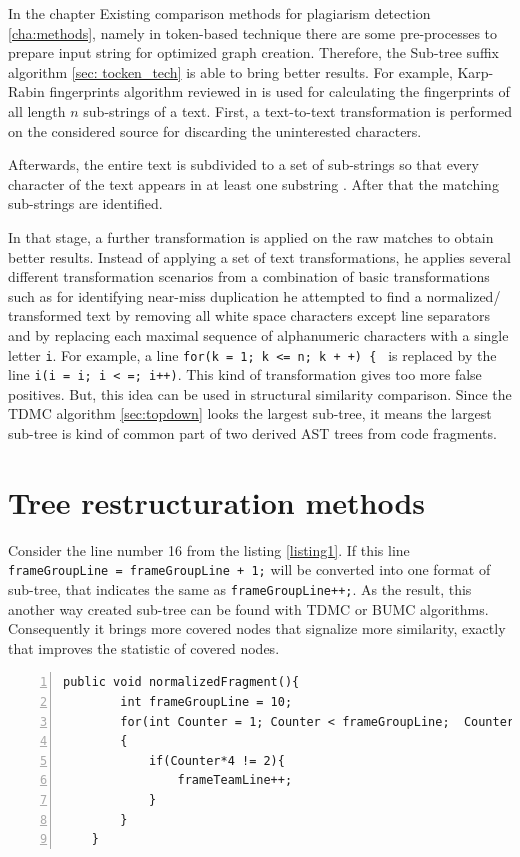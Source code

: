 \documentclass{report}
\begin{document}
In the chapter Existing comparison methods for plagiarism detection \ref{cha:methods}, namely in token-based technique there are some pre-processes to prepare input string for optimized graph creation. Therefore, the Sub-tree suffix algorithm \ref{sec: tocken_tech} is able to bring better results.
For example, Karp-Rabin fingerprints algorithm reviewed in \cite{software_clone_detection} is used for calculating the fingerprints of all
length $n$ sub-strings of a text. First, a text-to-text transformation is performed on the considered source for discarding the uninterested characters.

Afterwards, the entire text
is subdivided to a set of sub-strings so that every character of the text appears in at least
one substring \cite{software_clone_detection}. After that the matching sub-strings are identified. 

In that stage, a further transformation is applied on the raw matches to obtain better results. Instead of applying
a set of text transformations, he applies several different transformation scenarios
from a combination of basic transformations such as for identifying near-miss duplication he
attempted to find a normalized/ transformed text by removing all white space characters
except line separators and by replacing each maximal sequence of alphanumeric characters
with a single letter \texttt{i}. For example, a line \texttt{for(k = 1; k <= n; k + +) \{ } is replaced by
the line \texttt{i(i = i; i < =; i++)}. This kind of transformation gives too more false positives. But, this idea can be used in structural similarity comparison. Since the TDMC algorithm \ref{sec:topdown} looks the largest sub-tree, it means the largest sub-tree is kind of common part of two derived AST trees from code fragments. \\

\section{Tree restructuration methods}
Consider the line number 16 from the listing \ref{listing1}. If this line \texttt{frameGroupLine = frameGroupLine + 1;} will be converted into one format of sub-tree, that indicates the same as \texttt{frameGroupLine++;}. As the result, this another way created sub-tree can be found with TDMC or BUMC algorithms. Consequently it brings more covered nodes that signalize more similarity, exactly that improves the statistic of covered nodes.

\begin{lstlisting}[caption= {Normalized function \texttt{normalizedFragment()} concerning variable \texttt {frameGroupLine}.}, label = listing2, numbers=left, numbersep=-5pt]
	public void normalizedFragment(){
		int frameGroupLine = 10;
		for(int Counter = 1; Counter < frameGroupLine;  Counter =+ 2)
		{
			if(Counter*4 != 2){ 
				frameTeamLine++;
			}
		}
	}
\end{lstlisting}
\end{document}
